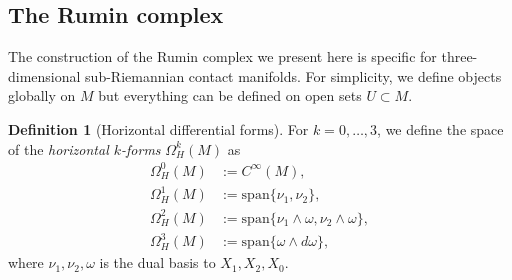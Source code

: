 \documentclass{amsart}
\theoremstyle{plain}
\theoremstyle{definition}
\newtheorem{definition}[thm]{Definition}
\theoremstyle{remark}
\newcommand{\blue}{\color{blue}}
\newcommand{\diff}{d}%
\newcommand{\sr}{sub-{R}ie\-man\-nian }
\begin{document}
\subsection{The {R}umin complex}
\label{prel:Rumin}
The construction of the {R}umin complex we present here is specific for three-dimensional \sr contact manifolds. For simplicity, we define objects globally on $M$ but everything can be defined on open sets $U\subset M$.

\begin{definition}[Horizontal differential forms]
For $k=0,\dots,3$, 
we define the space of the \emph{horizontal $k$-forms} $\Omega^k_H(M)$ as
\begin{equation}
\begin{split}
\Omega^0_H(M)&:=C^\infty(M),\\
\Omega^1_H(M) &:=\mathrm{span}\{\nu_1,\nu_2\}, %
\\
\Omega^2_H(M)&:=\mathrm{span}\{\nu_1\wedge\omega,\nu_2\wedge\omega\},\\
\Omega^3_H(M)&:=\mathrm{span}\{\omega\wedge\diff \omega\},
\end{split}
\end{equation}
where $\nu_1,\nu_2,\omega$ is the dual basis to  $X_1,X_2,X_0$.
\end{definition}
\end{document}
